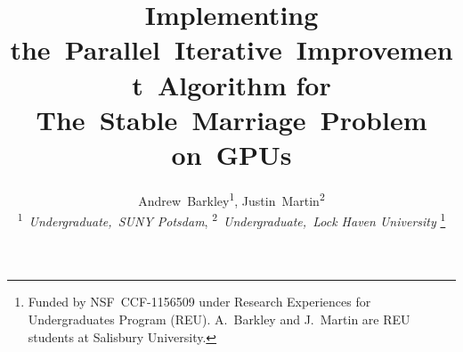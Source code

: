 \documentclass[journal]{IEEEtran}
\begin{document}
%
\title{Implementing the~Parallel~Iterative~Improvement~Algorithm for
The~Stable~Marriage~Problem on~GPUs}
%
%
%

\author{
Andrew~Barkley\textsuperscript{1},
Justin~Martin\textsuperscript{2}
\\
\textsuperscript{1}~\emph{Undergraduate,~SUNY Potsdam},
\textsuperscript{2}~\emph{Undergraduate,~Lock Haven University}
\thanks{Funded by NSF~CCF-1156509 under Research Experiences for Undergraduates
Program (REU). A.~Barkley and J.~Martin are REU students at Salisbury
University.}
}



% 











\maketitle
\end{document}
